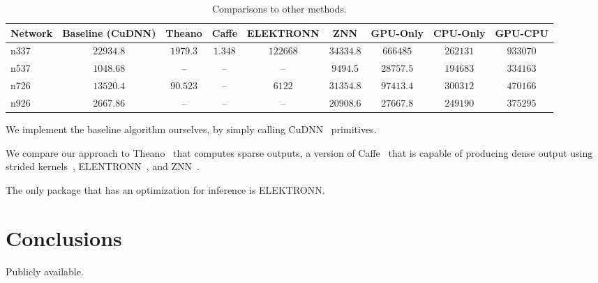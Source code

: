 \documentclass[conference]{IEEEtran}
\begin{document}
  \begin{table}[t]
    \centering
    \begin{tabular}{l|cccccccc}
      \toprule
      Network  & Baseline (CuDNN)    & Theano     & Caffe    & ELEKTRONN  & ZNN        & GPU-Only   & CPU-Only   & GPU-CPU \\
      \midrule
      n337     & $22934.8$           & $1979.3$   & $1.348$  & $122668$   & $34334.8$  & $666485$   & $262131$   & $933070$ \\
      n537     & $1048.68$           & --         & --       & --         & $9494.5$   & $28757.5$  & $194683$   & $334163$ \\
      n726     & $13520.4$           & $90.523$   & --       & $6122$     & $31354.8$  & $97413.4$  & $300312$   & $470166$ \\
      n926     & $2667.86$           & --         & --       & --         & $20908.6$  & $27667.8$  & $249190$   & $375295$ \\
      \bottomrule
    \end{tabular}
    \caption{Comparisons to other methods.}
    \label{table:conv_complexity}
  \end{table}

  We implement the baseline algorithm ourselves, by simply calling
  CuDNN~\cite{chetlur2014cudnn} primitives.

  We compare our approach to Theano~\cite{bergstra2010theano} that
  computes sparse outputs, a version of Caffe~\cite{jia2014caffe} that
  is capable of producing dense output using strided
  kernels~\cite{tschopp2015efficient}, ELENTRONN~\cite{ELEKTRONN2015},
  and ZNN~\cite{zlateski2015znn}.

  The only package that has an optimization for inference is
  ELEKTRONN.


\section{Conclusions}

  Publicly available.


\clearpage

{\small


}
\end{document}
